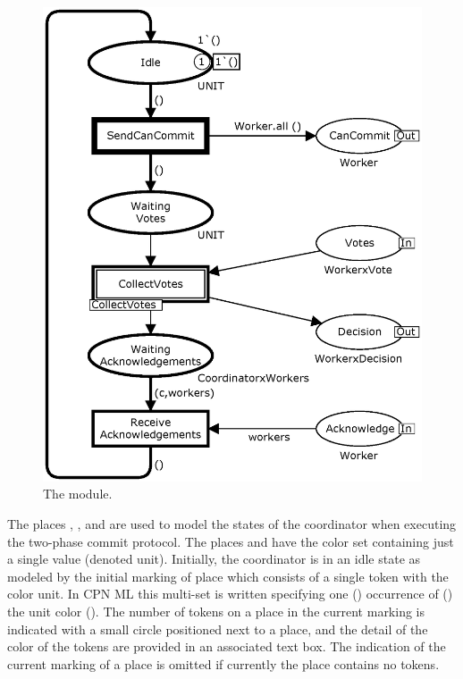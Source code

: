 \begin{figure}[]
\centering
\includegraphics[scale=.45]{figures/Coordinator.eps}
\caption{The  module.}
\label{fig:coordinator}
\end{figure}



The places , , and
 are used to model the states of the
coordinator when executing the two-phase commit protocol. The places
 and  have the color set
 containing just a single value \smlcode{()} (denoted
unit). Initially, the coordinator is in an idle state as modeled by
the initial marking of place  which consists of a single
token with the color unit. In CPN ML this multi-set is written
 specifying one () occurrence of
() the unit color (\smlcode{()}).  The number of tokens on
a place in the current marking is indicated with a small circle
positioned next to a place, and the detail of the color of the tokens
are provided in an associated text box. The indication of the current
marking of a place is omitted if currently the place contains no
tokens.

